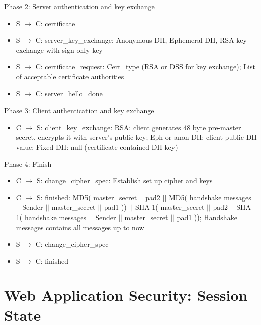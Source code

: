 \documentclass[fs, footer]{latex4ei}
\begin{document}
\begin{multicols*}{4}
{Phase 2:  Server  authentication    and key exchange
\begin{itemize}
	\item S $\rightarrow$ C:  certificate
	\item S $\rightarrow$ C:  server\_key\_exchange: Anonymous DH, Ephemeral   DH, RSA key exchange    with    sign-only   key
	\item S $\rightarrow$ C:  certificate\_request: Cert\_type (RSA    or  DSS for key exchange); List  of  acceptable  certificate  authorities
	\item S $\rightarrow$ C:  server\_hello\_done
\end{itemize}

Phase 3:  Client  authentication and key exchange
\begin{itemize}
	\item C $\rightarrow$ S: client\_key\_exchange: RSA: client generates 48  byte pre-master  secret, encrypts it  with server’s
	public  key; Eph or  anon DH: client  public  DH  value; Fixed DH: null (certificate contained DH  key)
\end{itemize}

Phase 4: Finish
\begin{itemize}
	\item C $\rightarrow$ S: change\_cipher\_spec: Establish set up cipher and keys
	\item C $\rightarrow$ S: finished: MD5( master\_secret $||$ pad2 $||$ MD5( handshake messages $||$ Sender $||$ master\_secret $||$ pad1 )) $||$ SHA-1( master\_secret $||$ pad2 $||$ SHA-1( handshake messages $||$ Sender $||$ master\_secret $||$ pad1 )); Handshake messages contains all messages up to now
	\item S $\rightarrow$ C: change\_cipher\_spec
	\item S $\rightarrow$ C: finished
\end{itemize}
}
\section{Web Application Security: Session State}
 \sectionbox {
}
\end{multicols*}
\end{document}
